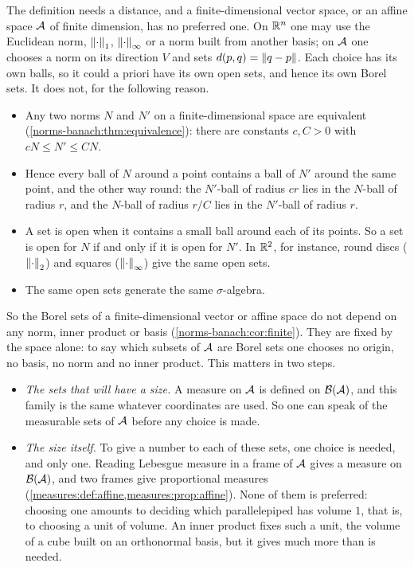 \begin{notechapter}
The definition needs a distance, and a finite-dimensional vector space,
or an affine space $\mathcal{A}$ of finite dimension, has no preferred one. On
$\mathbb{R}^n$ one may use the Euclidean norm, $\left\|\cdot\right\|_1$, $\left\|\cdot\right\|_\infty$
or a norm built from another basis; on $\mathcal{A}$ one chooses a norm on its
direction $V$ and sets $d(p, q) = \left\|q - p\right\|$. Each choice has its own
balls, so it could a priori have its own open sets, and hence its own
Borel sets. It does not, for the following reason.
\begin{itemize}[nosep]
  \item Any two norms $N$ and $N'$ on a finite-dimensional space are
        equivalent (\cref{norms-banach:thm:equivalence}): there are
        constants $c, C > 0$ with $cN\leq N'\leq CN$.
  \item Hence every ball of $N$ around a point contains a ball of $N'$
        around the same point, and the other way round: the $N'$-ball of
        radius $cr$ lies in the $N$-ball of radius $r$, and the
        $N$-ball of radius $r/C$ lies in the $N'$-ball of radius $r$.
  \item A set is open when it contains a small ball around each of its
        points. So a set is open for $N$ if and only if it is open for
        $N'$. In $\mathbb{R}^2$, for instance, round discs ($\left\|\cdot\right\|_2$) and
        squares ($\left\|\cdot\right\|_\infty$) give the same open sets.
  \item The same open sets generate the same $\sigma$-algebra.
\end{itemize}
So the Borel sets of a finite-dimensional vector or affine space do not
depend on any norm, inner product or basis
(\cref{norms-banach:cor:finite}). They are fixed by the space alone:
to say which subsets of $\mathcal{A}$ are Borel sets one chooses no origin, no
basis, no norm and no inner product. This matters in two steps.
\begin{itemize}[nosep]
  \item \emph{The sets that will have a size.} A measure on $\mathcal{A}$ is
        defined on $\mathcal B(\mathcal{A})$, and this family is the same
        whatever coordinates are used. So one can speak of the
        measurable sets of $\mathcal{A}$ before any choice is made.
  \item \emph{The size itself.} To give a number to each of these sets,
        one choice is needed, and only one. Reading Lebesgue measure in
        a frame of $\mathcal{A}$ gives a measure on $\mathcal B(\mathcal{A})$, and
        two frames give proportional measures
        (\cref{measures:def:affine,measures:prop:affine}). None of them
        is preferred: choosing one amounts to deciding which
        parallelepiped has volume $1$, that is, to choosing a unit of
        volume. An inner product fixes such a unit, the volume of a
        cube built on an orthonormal basis, but it gives much more
        than is needed.
\end{itemize}


\end{notechapter}
